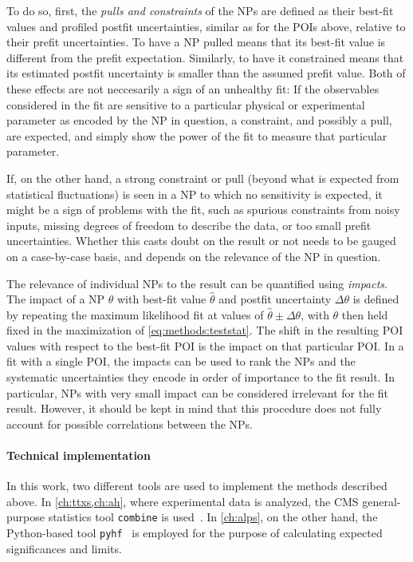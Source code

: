 To do so, first, the \textit{pulls and constraints} of the NPs are defined as their best-fit values and profiled postfit uncertainties, similar as for the POIs above, relative to their prefit uncertainties. To have a NP pulled means that its best-fit value is different from the prefit expectation. Similarly, to have it constrained means that its estimated postfit uncertainty is smaller than the assumed prefit value. Both of these effects are not neccesarily a sign of an unhealthy fit: If the observables considered in the fit are sensitive to a particular physical or experimental parameter as encoded by the NP in question, a constraint, and possibly a pull, are expected, and simply show the power of the fit to measure that particular parameter.

If, on the other hand, a strong constraint or pull (beyond what is expected from statistical fluctuations) is seen in a NP to which no sensitivity is expected, it might be a sign of problems with the fit, such as spurious constraints from noisy inputs, missing degrees of freedom to describe the data, or too small prefit uncertainties. Whether this casts doubt on the result or not needs to be gauged on a case-by-case basis, and depends on the relevance of the NP in question.

The relevance of individual NPs to the result can be quantified using \textit{impacts}. The impact of a NP $\theta$ with best-fit value $\hat{\theta}$ and postfit uncertainty $\Delta \theta$ is defined by repeating the maximum likelihood fit at values of $\hat{\theta} \pm \Delta \theta$, with $\theta$ then held fixed in the maximization of \cref{eq:methods:teststat}. The shift in the resulting POI values with respect to the best-fit POI is the impact on that particular POI. In a fit with a single POI, the impacts can be used to rank the NPs and the systematic uncertainties they encode in order of importance to the fit result. In particular, NPs with very small impact can be considered irrelevant for the fit result. However, it should be kept in mind that this procedure does not fully account for possible correlations between the NPs.


\paragraph{Technical implementation}
In this work, two different tools are used to implement the methods described above. In \cref{ch:ttxs,ch:ah}, where experimental data is analyzed, the CMS general-purpose statistics tool \texttt{combine} is used~\cite{CMS:CAT-23-001}. In \cref{ch:alps}, on the other hand, the Python-based tool \texttt{pyhf}~\cite{pyhf,pyhf_joss} is employed for the purpose of calculating expected significances and limits.



